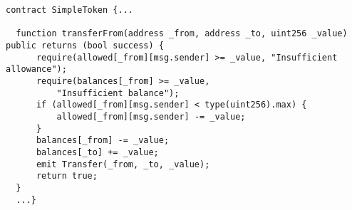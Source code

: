 \begin{lstlisting}[language=Solidity]
contract SimpleToken {...

  function transferFrom(address _from, address _to, uint256 _value) public returns (bool success) {
      require(allowed[_from][msg.sender] >= _value, "Insufficient allowance");
      require(balances[_from] >= _value, 
      	  "Insufficient balance");
      if (allowed[_from][msg.sender] < type(uint256).max) {
          allowed[_from][msg.sender] -= _value;
      }
      balances[_from] -= _value;
      balances[_to] += _value;
      emit Transfer(_from, _to, _value);
      return true;
  }    
  ...}
\end{lstlisting}